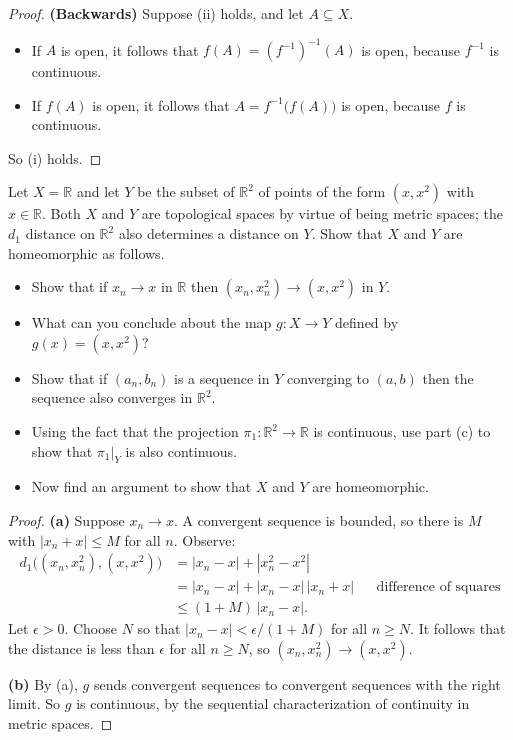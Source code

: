 \documentclass[minion]{homework}
\newcommand{\Reals}{\ensuremath{\mathbb R}}%
\begin{document}
\begin{problems}
\begin{proof}
\textbf{(Backwards)} Suppose (ii) holds, and let $A \subseteq X$.
\begin{itemize}
  \item If $A$ is open, it follows that $f(A) = (f^{-1})^{-1}(A)$ is open, because $f^{-1}$ is continuous.
  \item If $f(A)$ is open, it follows that $A = f^{-1}\big(f(A)\big)$ is open, because $f$ is continuous.
\end{itemize}
So (i) holds.
\end{proof}

\problem Let $X=\Reals$ and let $Y$ be the subset of $\Reals^2$ 
of points of the form $(x,x^2)$ with $x\in \Reals$. Both $X$ and $Y$
are topological spaces by virtue of being metric spaces; the $d_1$ 
distance on $\Reals^2$ also determines a distance on $Y$.
Show that $X$ and $Y$ are homeomorphic as follows.
\begin{itemize}
\item[(a)] Show that if $x_n\to x$ in $\Reals$ then $(x_n, x_n^2)\to (x,x^2)$ in $Y$.
\item[(b)] What can you conclude about the map $g:X\to Y$ defined by $g(x)=(x,x^2)$?
\item[(c)] Show that if $(a_n,b_n)$ is a sequence in $Y$ converging to $(a,b)$
then the sequence also converges in $\Reals^2$.
\item[(d)] Using the fact that the projection $\pi_1: \Reals^2 \to \Reals$ 
is continuous, use part (c) to show that $\pi_1|_Y$ is also continuous.
\item[(e)] Now find an argument to show that $X$ and $Y$ are homeomorphic.
\end{itemize}

\begin{proof}
\textbf{(a)} Suppose $x_n \to x$. A convergent sequence is bounded, so there is $M$ with $|x_n + x| \le M$ for all $n$. Observe:
\begin{align*}
d_1\big((x_n, x_n^2), (x, x^2)\big) &= |x_n - x| + |x_n^2 - x^2| \\
&= |x_n - x| + |x_n - x|\,|x_n + x| && \text{difference of squares} \\
&\le (1 + M)\,|x_n - x|.
\end{align*}
Let $\epsilon > 0$. Choose $N$ so that $|x_n - x| < \epsilon/(1+M)$ for all $n \ge N$. It follows that the distance is less than $\epsilon$ for all $n \ge N$, so $(x_n, x_n^2) \to (x, x^2)$.

\textbf{(b)} By (a), $g$ sends convergent sequences to convergent sequences with the right limit. So $g$ is continuous, by the sequential characterization of continuity in metric spaces.


\end{proof}
\end{problems}
\end{document}
